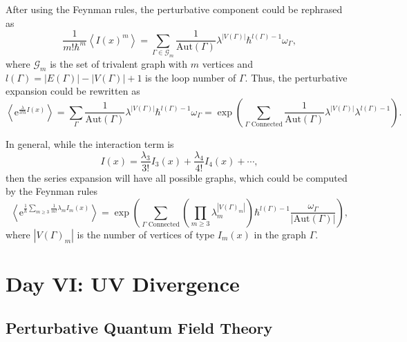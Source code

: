 \documentclass[10pt]{article}
\begin{document}
After using the Feynman rules, the perturbative component could be rephrased as
\begin{equation*}
  \frac{1}{m! \hbar^{m}} \left< I(x)^{m} \right> = \sum_{\Gamma \in \mathcal{G}_m} \frac{1}{\mathrm{Aut}(\Gamma)}\lambda^{\left| V(\Gamma) \right|} \hbar^{l(\Gamma) - 1} \omega_{\Gamma},
\end{equation*}
where $ \mathcal{G}_m$ is the set of trivalent graph
with $ m$ vertices and $ l(\Gamma) = \left| E(\Gamma) \right| - \left| V(\Gamma) \right| + 1$ is the loop number of $ \Gamma$. Thus, the perturbative expansion could be rewritten as
\begin{equation*}
  \left< \mathrm{e}^{\frac{\lambda}{3! \hbar} I(x)} \right> = \sum_{\Gamma} \frac{1}{\mathrm{Aut}(\Gamma)} \lambda^{\left| V(\Gamma) \right|} \hbar^{l(\Gamma) - 1}\omega_{\Gamma}  = \exp \left( \sum_{\Gamma \text{ Connected}} \frac{1}{\mathrm{Aut}(\Gamma)} \lambda^{\left| V(\Gamma) \right|} \lambda^{l(\Gamma) - 1}\right).
\end{equation*}

In general, while the interaction term is
\begin{equation*}
  I(x) = \frac{\lambda_3}{3!} I_3(x) + \frac{\lambda_4}{4!} I_4(x) + \cdots,
\end{equation*}
then the series expansion will have all possible graphs, which could be computed by the Feynman rules
\begin{equation*}
  \left< \mathrm{e}^{\frac{1}{\hbar} \sum_{m \ge 3} \frac{1}{m!} \lambda_{m} I_{m}(x)} \right> = \exp \left( \sum_{\Gamma \text{ Connected}}  \left( \prod_{m \ge 3} \lambda_{m}^{|V(\Gamma)_{m}|} \right) \hbar^{l(\Gamma) - 1} \frac{\omega_{\Gamma}}{\left| \mathrm{Aut}(\Gamma) \right|}\right),
\end{equation*}
where $ |V(\Gamma)_{m}|$ is the number of vertices of type $ I_m(x)$ in the graph $ \Gamma$.

\section{Day VI: UV Divergence}

\subsection{Perturbative Quantum Field Theory}
\end{document}
